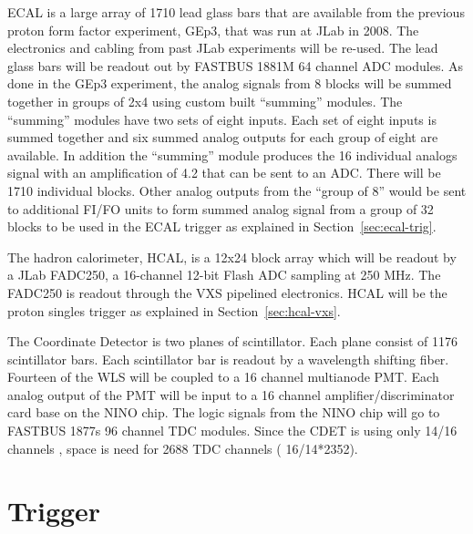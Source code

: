 \documentclass{article}
\begin{document}
ECAL is a large array of 1710 lead glass bars that are available from the
previous proton form factor experiment, GEp3, that was run at JLab in 2008.
The electronics and cabling from past JLab experiments will be re-used. The 
lead glass bars will be readout out by  FASTBUS 1881M 64 channel ADC modules. As done in the GEp3 experiment,
the analog signals from 8 blocks will be summed together in groups of 2x4 using custom built ``summing'' modules.
The ``summing'' modules have two sets of eight inputs. Each set of eight inputs is summed together
and six summed analog outputs for each group of eight are available. In addition the ``summing'' module 
produces the 16 individual
analogs signal with an amplification of 4.2 that can be sent to an ADC. There will be 1710 individual blocks.
Other analog outputs from the  ``group of 8'' would be sent to additional
FI/FO units to form summed analog signal from a group of 32 blocks to be used in the ECAL trigger as
explained in Section~\ref{sec:ecal-trig}.





The hadron calorimeter, HCAL, is a 12x24 block array which will be readout 
by a JLab FADC250, a 16-channel 12-bit Flash 
ADC sampling at 250 MHz.  The FADC250 is readout through the VXS pipelined electronics. HCAL will be the proton singles trigger as explained in Section~\ref{sec:hcal-vxs}.


The Coordinate Detector is  two planes of scintillator. Each plane consist of 1176 scintillator bars. 
Each scintillator bar is readout by a wavelength shifting fiber. Fourteen of the WLS  will be coupled to
a 16 channel multianode PMT. Each analog output of the PMT will be input to a 16 channel amplifier/discriminator
card base on the NINO chip. The logic signals from the NINO chip will go to FASTBUS 1877s 96 channel TDC modules.
Since the CDET is using only 14/16 channels , space is need for 2688 TDC channels ( 16/14*2352).

\section {Trigger}
\end{document}
